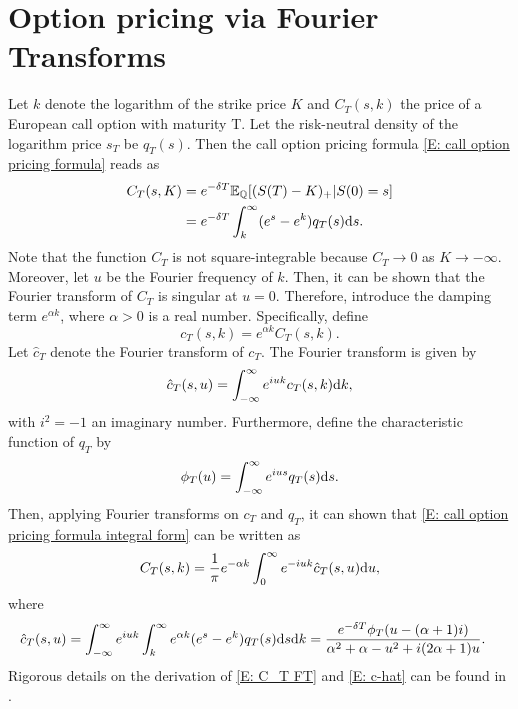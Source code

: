 \section{Option pricing via Fourier Transforms}
\label{appendix: Option pricing via Fourier Transforms}
Let $k$ denote the logarithm of the strike price $K$ and $C_T(s,k)$ the price of a European call option with maturity T. Let the risk-neutral density of the logarithm price $s_T$ be $q_T(s)$. Then the call option pricing formula \eqref{E: call option pricing formula} reads as
\begin{align}
    C_T(s,K) &= e^{-\delta T}\mathbb{E}_{\mathbb{Q}} [(S(T)-K)_+ | S(0) = s] \nonumber \\
    &= e^{-\delta T} \int_k^\infty (e^s-e^k) q_T(s) \mathrm{d} s. 
    \label{E: call option pricing formula integral form}
\end{align}
Note that the function $C_T$ is not square-integrable because $C_T \rightarrow 0$ as $K \rightarrow -\infty$. Moreover, let $u$ be the Fourier frequency of $k$. Then, it can be shown that the Fourier transform of $C_T$ is singular at $u=0$. Therefore, \textcite{carr1999option} introduce the damping term $e^{\alpha k}$, where $\alpha > 0$ is a real number. Specifically, define
\begin{equation}
    c_T(s,k) = e^{\alpha k} C_T(s,k). 
\end{equation}
Let $\hat c_T$ denote the Fourier transform of $c_T$. The Fourier transform is given by
\begin{equation*}
    \hat{c}_T(s,u) = \int_{-\infty}^\infty e^{iuk} c_T(s,k) \mathrm{d} k,
\end{equation*}
with $i^2=-1$ an imaginary number. Furthermore, define the characteristic function of $q_T$ by
\begin{equation}
    \phi_T(u) = \int_{-\infty}^{\infty} e^{ius} q_T(s) \mathrm{d} s. 
    \label{E: CF}
\end{equation}
Then, applying Fourier transforms on $c_T$ and $q_T$, it can shown that \eqref{E: call option pricing formula integral form} can be written as
\begin{equation}
    C_T(s,k) = \frac{1}{\pi} e^{-\alpha k} \int_{0}^\infty e^{-iuk} \hat c_T(s,u) \mathrm{d} u,
    \label{E: C_T FT}
\end{equation}
where 
\begin{align}
    \hat c_T(s,u) &= \int_{-\infty}^\infty e^{iuk} \int_k^\infty e^{\alpha k} (e^s-e^k) q_T(s) \mathrm{d} s \mathrm{d} k = \frac{e^{-\delta T}\phi_T(u-(\alpha+1)i)}{\alpha^2 + \alpha - u^2 + i(2\alpha +1)u}.
    \label{E: c-hat}
\end{align}
Rigorous details on the derivation of \eqref{E: C_T FT} and \eqref{E: c-hat} can be found in \cite{carr1999option}. 

